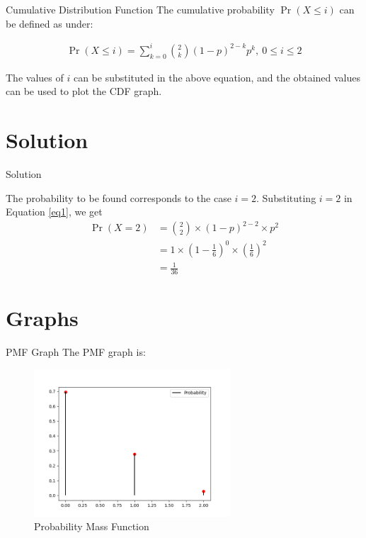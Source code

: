 \documentclass{beamer}
\providecommand{\pr}[1]{\ensuremath{\Pr\left(#1\right)}}
\providecommand{\brak}[1]{\ensuremath{\left(#1\right)}}
\begin{document}
\begin{frame}{Cumulative Distribution Function}
The cumulative probability $ \pr{X \leq i}$ can be defined as under:

\begin{block}{}
\begin{align}
          \label{eq2}
       \pr{X \leq i} = \sum_{k=0}^{i} \binom{2}{k} (1-p)^{2-k} p^k ,~ 0 \le i \le 2
\end{align}
\end{block}

The values of $i$ can be substituted in the above equation, and the obtained values can be used to plot the CDF graph.

\end{frame}


\section{Solution}
\begin{frame}{Solution}

The probability to be found corresponds to the case $i=2$. Substituting $i=2$ in Equation \ref{eq1}, we get
\begin{align}
    \pr{X=2} &= \binom{2}{2} \times {(1-p)}^{2-2} \times p^2 \\
             &= 1 \times \brak{1-\frac{1}{6}}^{0} \times \brak{\frac{1}{6}}^2 \\
             &= \frac{1}{36}
\end{align}
\end{frame}

\section{Graphs}
\begin{frame}{PMF Graph}
The PMF graph is:
    \begin{figure}[!ht]
		\centering
		\includegraphics[width=\textwidth,height=5.5cm,keepaspectratio]{figures/PMF.png}
		\caption{Probability Mass Function}
		\label{fig1}
	\end{figure}
\end{frame}
\end{document}
